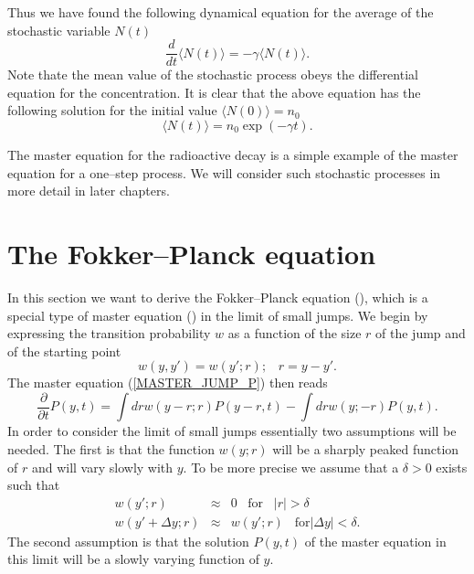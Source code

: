 Thus we have found the following dynamical equation for the 
average of the stochastic 
variable $N(t)$
\begin{equation}
\frac{d}{dt} \langle N(t) \rangle = - \gamma \langle N(t) \rangle.
\end{equation}
Note thate the mean value of the stochastic process obeys the 
differential equation for the concentration. It is clear that the 
above equation has the following solution for the initial value
$\langle N(0)\rangle = n_0$
\begin{equation*}
\langle N(t) \rangle = n_0 \exp(-\gamma t).
\end{equation*}

The master equation for the radioactive decay is a simple example 
of the master equation for a one--step process. We will consider
such stochastic processes in more detail in later chapters.

\section{The Fokker--Planck equation}
In this section we want to derive the Fokker--Planck equation
(\cite{RISKEN}),
which is a special type of master equation (\cite{VAN_KAMPEN})
in the limit of small jumps.
We begin by expressing the transition probability $w$ as a 
function of the size $r$ of the jump and of the starting point
\begin{equation*}
w(y,y') = w(y';r); \;\;\; r=y-y'.
\end{equation*}
The master equation (\ref{MASTER_JUMP_P}) then reads
\begin{equation}
\label{MASTER_SMALL_JUMP}
\frac{\partial}{\partial t} P(y,t) =
  \int dr w(y-r;r)P(y-r,t) - \int dr w(y;-r)P(y,t).
\end{equation}
In order to consider the limit of small jumps essentially
two assumptions will be needed. The first is that
the function
$w(y;r)$ will be a sharply peaked function of $r$ and will
vary slowly with $y$. To be more precise we assume that a $\delta >0$
exists such that
\begin{eqnarray*}
w(y';r)  & \approx & 0 \;\;\; \text{for} \;\;\; |r|> \delta \\
w(y'+\Delta y;r) & \approx & w(y';r) \;\;\; \text{for} |\Delta y| < 
\delta.
\end{eqnarray*}
The second assumption is that the solution $P(y,t)$ of the master equation 
in this limit will be a slowly varying function of $y$.

